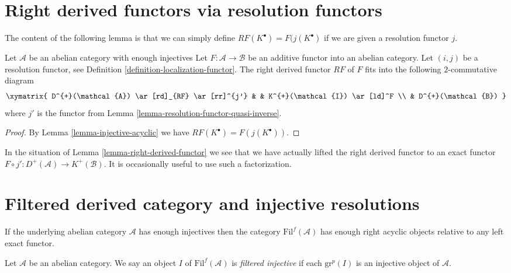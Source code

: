 \section{Right derived functors via resolution functors}
\label{section-right-derived-functor-via-resolutions}

\noindent
The content of the following lemma is that we can simply define
$RF(K^\bullet) = F(j(K^\bullet)$ if we are given a resolution functor $j$.

\begin{lemma}
\label{lemma-right-derived-functor}
Let $\mathcal{A}$ be an abelian category with enough injectives
Let $F : \mathcal{A} \to \mathcal{B}$ be an additive functor into
an abelian category. Let $(i, j)$ be a resolution functor, see
Definition \ref{definition-localization-functor}.
The right derived functor $RF$ of $F$ fits into the following
$2$-commutative diagram
$$
\xymatrix{
D^{+}(\mathcal{A}) \ar[rd]_{RF} \ar[rr]^{j'} & &
K^{+}(\mathcal{I}) \ar[ld]^F \\
& D^{+}(\mathcal{B})
}
$$
where $j'$ is the functor from
Lemma \ref{lemma-resolution-functor-quasi-inverse}.
\end{lemma}

\begin{proof}
By
Lemma \ref{lemma-injective-acyclic}
we have $RF(K^\bullet) = F(j(K^\bullet))$.
\end{proof}

\begin{remark}
\label{remark-right-derived-functor}
In the situation of
Lemma \ref{lemma-right-derived-functor}
we see that we have actually lifted the right derived
functor to an exact functor
$F \circ j' : D^{+}(\mathcal{A}) \to K^{+}(\mathcal{B})$.
It is occasionally useful to use such a factorization.
\end{remark}








\section{Filtered derived category and injective resolutions}
\label{section-filtered-derived}

\noindent
If the underlying abelian category $\mathcal{A}$ has enough injectives
then the category $\text{Fil}^f(\mathcal{A})$ has enough right
acyclic objects relative to any left exact functor.

\begin{definition}
\label{definition-filtered-complexes-notation}
Let $\mathcal{A}$ be an abelian category.
We say an object $I$ of $\text{Fil}^f(\mathcal{A})$
is {\it filtered injective} if each $\text{gr}^p(I)$ is
an injective object of $\mathcal{A}$.
\end{definition}

